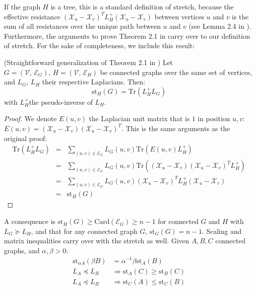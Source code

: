 If the graph $H$ is a tree, this is a standard definition of stretch,
because the effective resistance $\left(\mathcal{X}_{u}-\mathcal{X}_{v}\right)^{T}L_{H}^{+}\left(\mathcal{X}_{u}-\mathcal{X}_{v}\right)$
between vertices $u$ and $v$ is the sum of all resistances over
the unique path between $u$ and $v$ (see Lemma 2.4 in \cite{Spielman2009b}).
Furthermore, the arguments to prove Theorem 2.1 in \cite{Spielman2009b}
carry over to our definition of stretch. For the sake of completeness,
we include this result: 
\begin{lemma}
\label{lem:stretch-trace}(Straightforward generalization of Theorem
2.1 in \cite{Spielman2009b}) Let $G=\left(\mathcal{V},\,\mathcal{E}_{G}\right),\, H=\left(\mathcal{V},\,\mathcal{E}_{H}\right)$
be connected graphs over the same set of vertices, and $L_{G}$, $L_{H}$
their respective Laplacians. Then: 
\[
\text{st}_{H}\left(G\right)=\text{Tr}\left(L_{H}^{+}L_{G}\right)
\]
with $L_{H}^{+}$the pseudo-inverse of $L_{H}$.\end{lemma}
\begin{proof}
We denote $E\left(u,v\right)$ the Laplacian unit matrix that is $1$
in position $u,v$: $E\left(u,v\right)=\left(\mathcal{X}_{u}-\mathcal{X}_{v}\right)\left(\mathcal{X}_{u}-\mathcal{X}_{v}\right)^{T}$.
This is the same arguments as the original proof: 
\begin{eqnarray*}
\text{Tr}\left(L_{H}^{+}L_{G}\right) & = & \sum_{\left(u,v\right)\in\mathcal{E}_{G}}L_{G}\left(u,v\right)\text{Tr}\left(E\left(u,v\right)L_{H}^{+}\right)\\
 & = & \sum_{\left(u,v\right)\in\mathcal{E}_{G}}L_{G}\left(u,v\right)\text{Tr}\left(\left(\mathcal{X}_{u}-\mathcal{X}_{v}\right)\left(\mathcal{X}_{u}-\mathcal{X}_{v}\right)^{T}L_{H}^{+}\right)\\
 & = & \sum_{\left(u,v\right)\in\mathcal{E}_{G}}L_{G}\left(u,v\right)\left(\mathcal{X}_{u}-\mathcal{X}_{v}\right)^{T}L_{H}^{+}\left(\mathcal{X}_{u}-\mathcal{X}_{v}\right)\\
 & = & \text{st}_{H}\left(G\right)
\end{eqnarray*}

\end{proof}
A consequence is $\text{st}_{H}\left(G\right)\geq\text{Card}\left(\mathcal{E}_{G}\right)\geq n-1$
for connected $G$ and $H$ with $L_{G}\succeq L_{H}$, and that for
any connected graph $G$, $\text{st}_{G}\left(G\right)=n-1$. Scaling
and matrix inequalities carry over with the stretch as well. Given
$A,B,C$ connected graphs, and $\alpha,\beta>0$: 
\begin{align*}
\text{st}_{\alpha A}\left(\beta B\right) & =\alpha^{-1}\beta\text{st}_{A}\left(B\right)\\
L_{A}\preceq L_{B} & \Rightarrow\text{st}_{A}\left(C\right)\geq\text{st}_{B}\left(C\right)\\
L_{A}\preceq L_{B} & \Rightarrow\text{st}_{C}\left(A\right)\leq\text{st}_{C}\left(B\right)
\end{align*}

